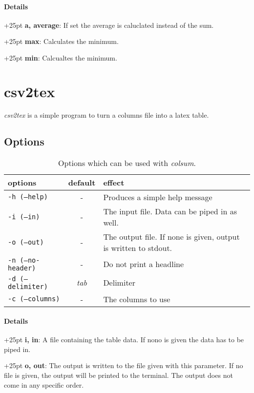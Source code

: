 \documentclass[a4paper,10pt,parskip=half]{scrreprt}
\begin{document}
\subsubsection{Details}

\hangindent+25pt 
\textbf{a, average}: If set the average is caluclated instead of the sum.

\hangindent+25pt 
\textbf{max}: Calculates the minimum.

\hangindent+25pt 
\textbf{min}: Calcualtes the minimum.



\chapter{csv2tex}


\textit{csv2tex} is a simple program to turn a columns file into a latex table.

\section{Options}
\begin{table}[h]
\caption{Options which can be used with \textit{colsum}.}
\begin{tabular}{lcp{7cm}}\hline
options& default & effect \\\hline
 \texttt{-h (--help)}&- & Produces a simple help message\\
 \texttt{-i (--in)} &-& The input file. Data can be piped in as well.\\
 \texttt{-o (--out)} &-& The output file. If none is given, output is written to stdout.\\
 \texttt{-n (--no-header)} & - & Do not print a headline\\
 \texttt{-d (--delimiter)} & \textit{tab} & Delimiter\\
 \texttt{-c (--columns)} &-& The columns to use\\
\end{tabular}
\end{table}

\subsubsection{Details}
\hangindent+25pt 
\textbf{i, in}: A file containing the table data. If nono is given the data has to be piped in.

\hangindent+25pt 
\textbf{o, out}: The output is written to the file given with this parameter. If
no file is given, the output will be printed to the terminal. The output does
not come in any specific order.
\end{document}
